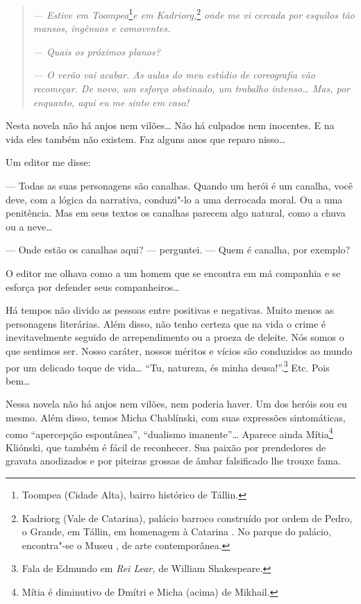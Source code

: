 \begin{quotation}
\emph{--- Estive em Toompea}\footnote{Toompea (Cidade Alta), bairro
  histórico de Tállin.}\emph{e em Kadriorg,}\footnote{Kadriorg (Vale de
  Catarina), palácio barroco construído por ordem de Pedro, o Grande, em
  Tállin, em homenagem à Catarina . No parque do palácio, encontra"-se o
  Museu , de arte contemporânea.} \emph{onde me vi cercada por
esquilos tão mansos, ingênuos e comoventes.}

\emph{--- Quais os próximos planos?}

\emph{--- O verão vai acabar. As aulas do meu estúdio de coreografia vão
recomeçar. De novo, um esforço obstinado, um trabalho intenso\ldots{} Mas,
por enquanto, aqui eu me sinto em casa!}
\end{quotation}

Nesta novela não há anjos nem vilões\ldots{} Não há culpados nem inocentes. E
na vida eles também não existem. Faz alguns anos que reparo nisso\ldots{}

Um editor me disse:

--- Todas as suas personagens são canalhas. Quando um herói é um
canalha, você deve, com a lógica da narrativa, conduzi"-lo a uma
derrocada moral. Ou a uma penitência. Mas em seus textos os canalhas
parecem algo natural, como a chuva ou a neve\ldots{}

--- Onde estão os canalhas aqui? --- perguntei. --- Quem é canalha, por
exemplo?

O editor me olhava como a um homem que se encontra em má companhia e se
esforça por defender seus companheiros\ldots{}

Há tempos não divido as pessoas entre positivas e negativas. Muito menos
as personagens literárias. Além disso, não tenho certeza que na vida o
crime é inevitavelmente seguido de arrependimento ou a proeza de
deleite. Nós somos o que sentimos ser. Nosso caráter, nossos méritos e
vícios são conduzidos ao mundo por um delicado toque de vida\ldots{} ``Tu,
natureza, és minha deusa!''.\footnote{Fala de Edmundo em \emph{Rei Lear,}
  de William Shakespeare.} Etc. Pois bem\ldots{}

Nessa novela não há anjos nem vilões, nem poderia haver. Um dos heróis
sou eu mesmo. Além disso, temos Micha Chablínski, com suas expressões
sintomáticas, como ``apercepção espontânea'', ``dualismo imanente''\ldots{}
Aparece ainda Mítia\footnote{Mítia é diminutivo de Dmítri e Micha
  (acima) de Mikhail.} Kliónski, que também é fácil de reconhecer. Sua
paixão por prendedores de gravata anodizados e por piteiras grossas de
âmbar falsificado lhe trouxe fama.


